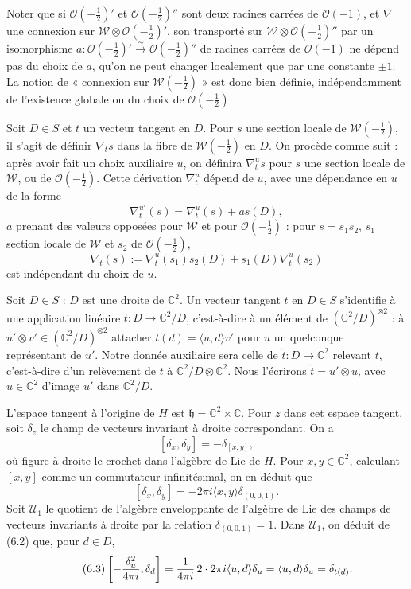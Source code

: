 \documentclass[11pt]{article}
\newcommand{\C}{\mathbb C}
\newcommand{\cO}{\mathcal O}
\newcommand{\cW}{\mathcal W}
\newcommand{\half}{\tfrac12}
\begin{document}
Noter que si $\cO(-\half)'$ et $\cO(-\half)''$ sont deux racines carrées de $\cO(-1)$, et $\nabla$ une connexion sur $\cW\otimes\cO(-\half)'$, son transporté sur $\cW\otimes\cO(-\half)''$ par un isomorphisme $a:\cO(-\half)'\xrightarrow{\sim}\cO(-\half)''$ de racines carrées de $\cO(-1)$ ne dépend pas du choix de $a$, qu'on ne peut changer localement que par une constante $\pm1$. La notion de « connexion sur $\cW(-\half)$ » est donc bien définie, indépendamment de l'existence globale ou du choix de $\cO(-\half)$.

Soit $D\in S$ et $t$ un vecteur tangent en $D$. Pour $s$ une section locale de $\cW(-\half)$, il s'agit de définir $\nabla_t s$ dans la fibre de $\cW(-\half)$ en $D$. On procède comme suit : après avoir fait un choix auxiliaire $u$, on définira $\nabla_t^u s$ pour $s$ une section locale de $\cW$, ou de $\cO(-\half)$. Cette dérivation $\nabla_t^u$ dépend de $u$, avec une dépendance en $u$ de la forme
\[
\nabla_t^{u'}(s)=\nabla_t^u(s)+as(D),
\]
$a$ prenant des valeurs opposées pour $\cW$ et pour $\cO(-\half)$ : pour $s=s_1s_2$, $s_1$ section locale de $\cW$ et $s_2$ de $\cO(-\half)$,
\[
\nabla_t(s):=\nabla_t^u(s_1)s_2(D)+s_1(D)\nabla_t^u(s_2)
\]
est indépendant du choix de $u$.

Soit $D\in S$ : $D$ est une droite de $\C^2$. Un vecteur tangent $t$ en $D\in S$ s'identifie à une application linéaire $t:D\to\C^2/D$, c'est-à-dire à un élément de $(\C^2/D)^{\otimes2}$ : à $u'\otimes v'\in(\C^2/D)^{\otimes2}$ attacher $t(d)=\langle u,d\rangle v'$ pour $u$ un quelconque représentant de $u'$. Notre donnée auxiliaire sera celle de $\tilde t:D\to\C^2$ relevant $t$, c'est-à-dire d'un relèvement de $t$ à $\C^2/D\otimes\C^2$. Nous l'écrirons $\tilde t=u'\otimes u$, avec $u\in\C^2$ d'image $u'$ dans $\C^2/D$.

L'espace tangent à l'origine de $H$ est $\mathfrak h=\C^2\times\C$. Pour $z$ dans cet espace tangent, soit $\delta_z$ le champ de vecteurs invariant à droite correspondant. On a
\[
[\delta_x,\delta_y]=-\delta_{[x,y]},
\]
où figure à droite le crochet dans l'algèbre de Lie de $H$. Pour $x,y\in\C^2$, calculant $[x,y]$ comme un commutateur infinitésimal, on en déduit que
\begin{equation}\tag{6.2}
[\delta_x,\delta_y]=-2\pi i\langle x,y\rangle\delta_{(0,0,1)}.
\end{equation}
Soit $\mathcal U_1$ le quotient de l'algèbre enveloppante de l'algèbre de Lie des champs de vecteurs invariants à droite par la relation $\delta_{(0,0,1)}=1$. Dans $\mathcal U_1$, on déduit de (6.2) que, pour $d\in D$,
\begin{equation}\tag{6.3}
\left[-{\delta_u^2\over4\pi i},\delta_d\right]
={1\over4\pi i}\,2\cdot2\pi i\langle u,d\rangle\delta_u
=\langle u,d\rangle\delta_u=\delta_{t(d)}.
\end{equation}
\end{document}
